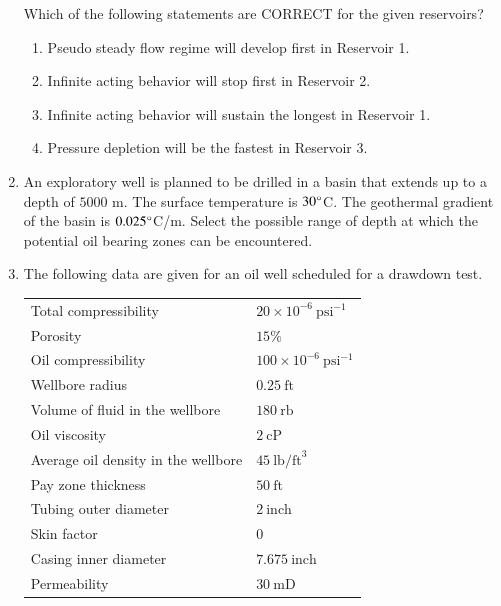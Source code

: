 \documentclass[journal,12pt,onecolumn]{IEEEtran}
\theoremstyle{remark}
\begin{document}
\begin{enumerate}
Which of the following statements are CORRECT for the given reservoirs?

\hfill{}

\begin{enumerate}
\item Pseudo steady flow regime will develop first in Reservoir 1.
\item Infinite acting behavior will stop first in Reservoir 2.
\item Infinite acting behavior will sustain the longest in Reservoir 1.
\item Pressure depletion will be the fastest in Reservoir 3.
\end{enumerate}

\item An exploratory well is planned to be drilled in a basin that extends up to a depth of $5000$ m. The surface temperature is $30{\degree}$C. The geothermal gradient of the basin is $0.025{\degree}$C/m. Select the possible range of depth at which the potential oil bearing zones can be encountered.

\hfill{}

\begin{enumerate}
\end{enumerate}

\item The following data are given for an oil well scheduled for a drawdown test.

\begin{tabular}{|l|l|}
\hline
Total compressibility & $20\times 10^{-6}\ \text{psi}^{-1}$ \\
Porosity & $15\%$ \\
Oil compressibility & $100\times 10^{-6}\ \text{psi}^{-1}$ \\
Wellbore radius & $0.25\ \text{ft}$ \\
Volume of fluid in the wellbore & $180\ \text{rb}$ \\
Oil viscosity & $2\ \text{cP}$ \\
Average oil density in the wellbore & $45\ \text{lb/ft}^3$ \\
Pay zone thickness & $50\ \text{ft}$ \\
Tubing outer diameter & $2\ \text{inch}$ \\
Skin factor & $0$ \\
Casing inner diameter & $7.675\ \text{inch}$ \\
Permeability & $30\ \text{mD}$ \\
\hline
\end{tabular}


\end{enumerate}
\end{document}
